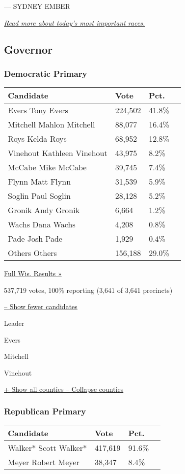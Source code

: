 --- SYDNEY EMBER

\href{https://www.nytimes3xbfgragh.onion/2018/08/14/us/politics/primary-results-minnesota-wisconsin.html}{\emph{Read
more about today's most important races.}}

\hypertarget{governor}{%
\subsection{Governor}\label{governor}}

\hypertarget{democratic-primary}{%
\subsubsection{Democratic Primary}\label{democratic-primary}}

\begin{longtable}[]{@{}llll@{}}
\toprule
Candidate & Vote & Pct. &\tabularnewline
\midrule
\endhead
 Evers Tony Evers & 224,502 & 41.8\% &\tabularnewline
 Mitchell Mahlon Mitchell & 88,077 & 16.4\% &\tabularnewline
 Roys Kelda Roys & 68,952 & 12.8\% &\tabularnewline
 Vinehout Kathleen Vinehout & 43,975 & 8.2\% &\tabularnewline
 McCabe Mike McCabe & 39,745 & 7.4\% &\tabularnewline
 Flynn Matt Flynn & 31,539 & 5.9\% &\tabularnewline
 Soglin Paul Soglin & 28,128 & 5.2\% &\tabularnewline
 Gronik Andy Gronik & 6,664 & 1.2\% &\tabularnewline
 Wachs Dana Wachs & 4,208 & 0.8\% &\tabularnewline
 Pade Josh Pade & 1,929 & 0.4\% &\tabularnewline
 Others Others & 156,188 & 29.0\% &\tabularnewline
\bottomrule
\end{longtable}

\href{https://www.nytimes3xbfgragh.onion/elections/results/wisconsin}{Full
Wis. Results »}

537,719 votes, 100\% reporting (3,641 of 3,641 precincts)

\protect\hyperlink{}{-- Show fewer candidates}

Leader

 Evers

 Mitchell

 Vinehout

\protect\hyperlink{}{+ Show all counties -- Collapse counties}

\hypertarget{republican-primary}{%
\subsubsection{Republican Primary}\label{republican-primary}}

\begin{longtable}[]{@{}llll@{}}
\toprule
Candidate & Vote & Pct. &\tabularnewline
\midrule
\endhead
 Walker* Scott Walker* & 417,619 & 91.6\% &\tabularnewline
 Meyer Robert Meyer & 38,347 & 8.4\% &\tabularnewline
\bottomrule
\end{longtable}

